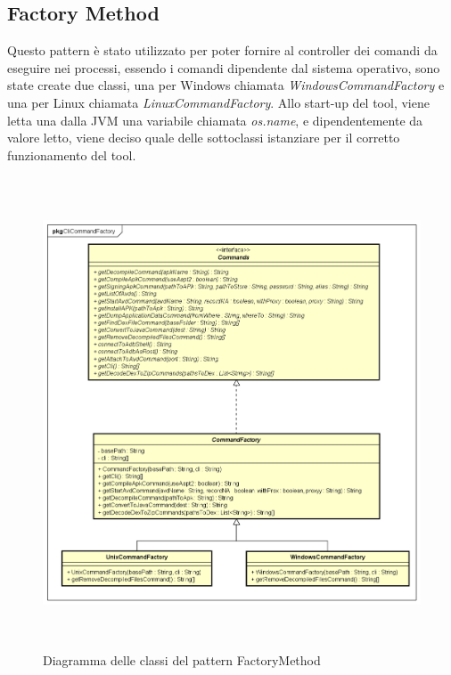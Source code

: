 \subsection{Factory Method}\label{subsec:factory-method}
Questo pattern è stato utilizzato per poter fornire al controller dei comandi da eseguire nei processi, essendo i comandi dipendente dal sistema operativo, sono state create due classi, una per Windows chiamata \textit{WindowsCommandFactory} e una per Linux chiamata \textit{LinuxCommandFactory}.
Allo start-up del tool, viene letta una dalla JVM una variabile chiamata \textit{os.name}, e dipendentemente da valore letto, viene deciso quale delle sottoclassi istanziare per il corretto funzionamento del tool.
\begin{figure}[H]
    \centering
    \includegraphics[width=14cm, height=14cm]{./immagini/diagrammi_uml/CommandFactory.png}
    \caption{Diagramma delle classi del pattern FactoryMethod}\label{fig:factory-method}
\end{figure}
